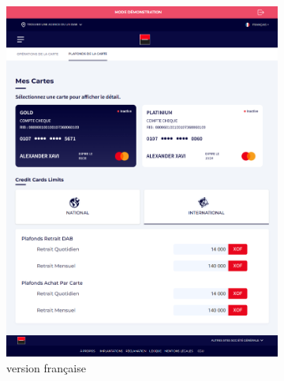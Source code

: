 \begin{figure}[!ht]
    \centering
    \begin{subfigure}[b]{0.49\textwidth}
        \centering
        \includegraphics[width=\textwidth]{images/screens/plafondsInter/tablette.png}
        \caption{version française}
    \end{subfigure}
    \hfill
    \begin{subfigure}[b]{0.49\textwidth}
        \centering

\end{subfigure}
\end{figure}
